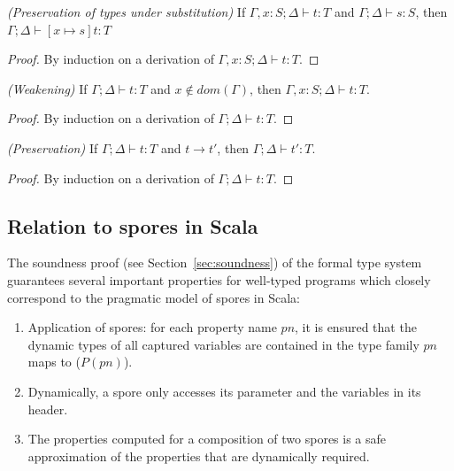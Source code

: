 \documentclass{llncs}
\begin{document}
\begin{lemma}
\emph{(Preservation of types under substitution)}
\label{lem:substitution}
If $\Gamma, x : S ; \Delta \vdash t : T$ and $\Gamma ; \Delta \vdash s : S$, then $\Gamma ; \Delta \vdash [x \mapsto s]t : T$
\vspace{-2.5mm}
\end{lemma}
\begin{proof}
By induction on a derivation of $\Gamma, x : S ; \Delta \vdash t : T$.
\end{proof}


\begin{lemma}
\emph{(Weakening)}
\label{lem:weak}
If $\Gamma ; \Delta \vdash t : T$ and $x \notin dom(\Gamma)$, then $\Gamma, x : S ; \Delta \vdash t : T$.
\vspace{-2.5mm}
\end{lemma}
\begin{proof}
By induction on a derivation of $\Gamma ; \Delta \vdash t : T$.
\end{proof}


\begin{theorem}
\emph{(Preservation)}
\label{th:pres}
If $\Gamma ; \Delta \vdash t : T$ and $t \rightarrow t'$, then $\Gamma ; \Delta \vdash t' : T$.
\vspace{-2.5mm}
\end{theorem}
\begin{proof}
By induction on a derivation of $\Gamma ; \Delta \vdash t : T$.
\end{proof}


\subsection{Relation to spores in Scala}

The soundness proof (see Section~\ref{sec:soundness}) of the formal type system guarantees several important properties for well-typed programs which closely correspond to the pragmatic model of spores in Scala:

\begin{enumerate}

\item Application of spores: for each property name $pn$, it is ensured that the dynamic types of all captured variables are contained in the type family $pn$ maps to ($P(pn)$).

\item Dynamically, a spore only accesses its parameter and the variables in its header.

\item The properties computed for a composition of two spores is a safe approximation of the properties that are dynamically required.

\end{enumerate}
\end{document}
